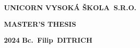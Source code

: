 \pagestyle{empty}
\begin{center}
{\Large\bfseries\MakeUppercase{Unicorn Vysoká škola~s.r.o.}}
	\vfill

	{\Huge\bfseries\MakeUppercase{Master's Thesis}} \\

	\vfill

	\noindent\begin{minipage}{\textwidth}
		         \begin{Large}
			         \textbf{2024} \hfill \textbf{Bc.~Filip~\MakeUppercase{Ditrich}}
		         \end{Large}
	\end{minipage}
\end{center}
